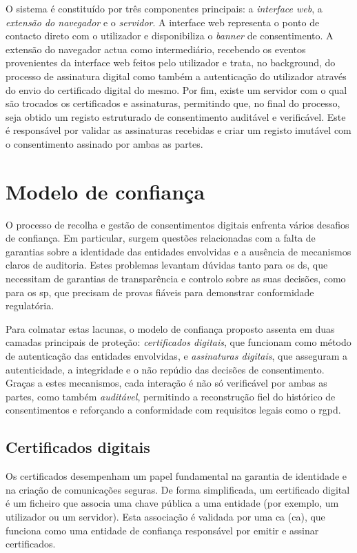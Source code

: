 O sistema é constituído por três componentes principais: a \textit{interface web}, a \textit{extensão do navegador} e o \textit{servidor}.
A interface web representa o ponto de contacto direto com o utilizador e disponibiliza o \textit{banner} de consentimento.
A extensão do navegador actua como intermediário, recebendo os eventos provenientes da interface web feitos pelo utilizador e trata, no background, do processo de assinatura digital como também a autenticação do utilizador através do envio do certificado digital do mesmo.
Por fim, existe um servidor com o qual são trocados os certificados e assinaturas, permitindo que, no final do processo, seja obtido um registo estruturado de consentimento auditável e verificável. Este é responsável por validar as assinaturas recebidas e criar um registo imutável com o consentimento assinado por ambas as partes.

\section{Modelo de confiança}

O processo de recolha e gestão de consentimentos digitais enfrenta vários desafios de confiança.
Em particular, surgem questões relacionadas com a falta de garantias sobre a identidade das entidades envolvidas e a ausência de mecanismos claros de auditoria. 
Estes problemas levantam dúvidas tanto para os \acrshort{ds}, que necessitam de garantias de transparência e controlo sobre as suas decisões, como para os \acrshort{sp}, que precisam de provas fiáveis para demonstrar conformidade regulatória.

Para colmatar estas lacunas, o modelo de confiança proposto assenta em duas camadas principais de proteção: 
\textit{certificados digitais}, que funcionam como método de autenticação das entidades envolvidas, e \textit{assinaturas digitais}, que asseguram a autenticidade, a integridade e o não repúdio das decisões de consentimento. 
Graças a estes mecanismos, cada interação é não só verificável por ambas as partes, como também \textit{auditável}, permitindo a reconstrução fiel do histórico de consentimentos e reforçando a conformidade com requisitos legais como o \acrshort{rgpd}.

\subsection{Certificados digitais}

Os certificados desempenham um papel fundamental na garantia de identidade e na criação de comunicações seguras. De forma simplificada, um certificado digital é um ficheiro que associa uma chave pública a uma entidade (por exemplo, um utilizador ou um servidor). Esta associação é validada por uma \acrlong{ca} (\acrshort{ca}), que funciona como uma entidade de confiança responsável por emitir e assinar certificados.

